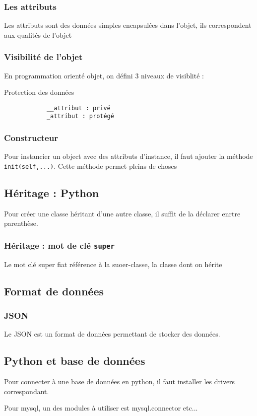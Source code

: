 \documentclass[12pt, a4paper]{article}
\begin{document}
    \subsubsection{Les attributs}
        Les attributs sont des données simples encapsulées dans l'objet, ils
        correspondent aux qualités de l'objet

    \subsubsection{Visibilité de l'objet}
        En programmation orienté objet, on défini 3 niveaux de visiblité :
        \begin{listing}[H]
            \caption{Protection des données}
            \label{lst:settings}
            \begin{verbatim}
            __attribut : privé
            _attribut : protégé
            \end{verbatim}
        \end{listing}
   
    \subsubsection{Constructeur}
    Pour instancier un object avec des attributs d'instance, il faut ajouter la
    méthode \texttt{init(self,...)}.
    Cette méthode permet pleins de choses

    \subsection{Héritage : Python}
    Pour créer une classe héritant d'une autre classe, il suffit de la 
    déclarer enrtre parenthèse. 

        \subsubsection{Héritage : mot de clé \texttt{super}}
        Le mot clé super fiat référence à la {suoer-classe}, la classe dont on 
        hérite

    \subsection{Format de données}
        \subsubsection{JSON}
        Le JSON est un format de données permettant de stocker des données. 

    \subsection{Python et base de données}
    Pour connecter à une base de données en python, il faut installer 
    les drivers correspondant. 

    Pour mysql, un des modules à utiliser est mysql.connector etc... 
    
    


   
\end{document}
